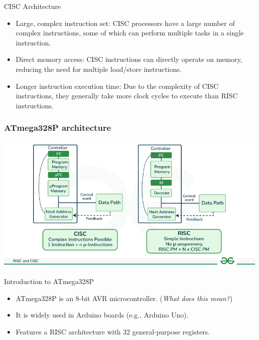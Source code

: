 \documentclass[aspectratio=169]{beamer}
\begin{document}
\begin{frame}{CISC Architecture}
    \begin{itemize}
        \item <1-> Large, complex instruction set: CISC processors have a large number of complex instructions, some of which can perform multiple tasks in a single instruction.
        \item <2-> Direct memory access: CISC instructions can directly operate on memory, reducing the need for multiple load/store instructions.
        \item <3-> Longer instruction execution time: Due to the complexity of CISC instructions, they generally take more clock cycles to execute than RISC instructions.
    \end{itemize}
\end{frame}

\begin{frame}
  \frametitle{ATmega328P architecture}
  \centering
  \includegraphics[height=0.9\textheight]{assets/RISC-and-CISC.png}
\end{frame}

\begin{frame}{Introduction to ATmega328P}
    \begin{itemize}
        \item <1-> ATmega328P is an 8-bit AVR microcontroller. (\textit{What does this mean?})
        \item <2-> It is widely used in Arduino boards (e.g., Arduino Uno).
        \item <3-> Features a RISC architecture with 32 general-purpose registers.
    \end{itemize}
\end{frame}
\end{document}
